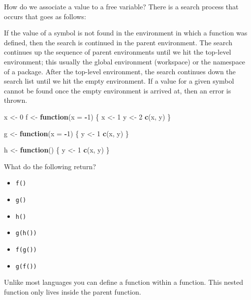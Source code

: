\documentclass[]{book}
\newenvironment{Shaded}{\begin{snugshade}}{\end{snugshade}}
\newcommand{\KeywordTok}[1]{\textcolor[rgb]{0.13,0.29,0.53}{\textbf{#1}}}
\newcommand{\DataTypeTok}[1]{\textcolor[rgb]{0.13,0.29,0.53}{#1}}
\newcommand{\DecValTok}[1]{\textcolor[rgb]{0.00,0.00,0.81}{#1}}
\newcommand{\StringTok}[1]{\textcolor[rgb]{0.31,0.60,0.02}{#1}}
\newcommand{\ControlFlowTok}[1]{\textcolor[rgb]{0.13,0.29,0.53}{\textbf{#1}}}
\newcommand{\OperatorTok}[1]{\textcolor[rgb]{0.81,0.36,0.00}{\textbf{#1}}}
\newcommand{\NormalTok}[1]{#1}
\providecommand{\tightlist}{%
  \setlength{\itemsep}{0pt}\setlength{\parskip}{0pt}}
\theoremstyle{definition}
\theoremstyle{definition}
\theoremstyle{definition}
\theoremstyle{remark}
\begin{document}
How do we associate a value to a free variable? There is a search
process that occurs that goes as follows:

If the value of a symbol is not found in the environment in which a
function was defined, then the search is continued in the parent
environment. The search continues up the sequence of parent environments
until we hit the top-level environment; this usually the global
environment (workspace) or the namespace of a package. After the
top-level environment, the search continues down the search list until
we hit the empty environment. If a value for a given symbol cannot be
found once the empty environment is arrived at, then an error is thrown.

\begin{Shaded}
\begin{Highlighting}[]
\NormalTok{x <-}\StringTok{ }\DecValTok{0}
\NormalTok{f <-}\StringTok{ }\ControlFlowTok{function}\NormalTok{(}\DataTypeTok{x =} \OperatorTok{-}\DecValTok{1}\NormalTok{) \{}
\NormalTok{  x <-}\StringTok{ }\DecValTok{1}
\NormalTok{  y <-}\StringTok{ }\DecValTok{2}
  \KeywordTok{c}\NormalTok{(x, y)}
\NormalTok{\}}

\NormalTok{g <-}\StringTok{ }\ControlFlowTok{function}\NormalTok{(}\DataTypeTok{x =} \OperatorTok{-}\DecValTok{1}\NormalTok{) \{}
\NormalTok{  y <-}\StringTok{ }\DecValTok{1}
  \KeywordTok{c}\NormalTok{(x, y)}
\NormalTok{\}}

\NormalTok{h <-}\StringTok{ }\ControlFlowTok{function}\NormalTok{() \{}
\NormalTok{  y <-}\StringTok{ }\DecValTok{1}
  \KeywordTok{c}\NormalTok{(x, y)}
\NormalTok{\}}
\end{Highlighting}
\end{Shaded}

What do the following return?

\begin{itemize}
\tightlist
\item
  \texttt{f()}
\item
  \texttt{g()}
\item
  \texttt{h()}
\item
  \texttt{g(h())}
\item
  \texttt{f(g())}
\item
  \texttt{g(f())}
\end{itemize}

Unlike most languages you can define a function within a function. This
nested function only lives inside the parent function.
\end{document}
